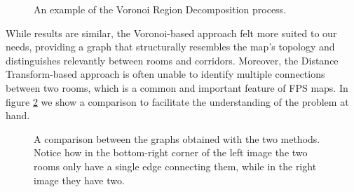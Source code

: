 \begin{figure}[hbt!]
    \qquad
    
    \caption[Voronoi Region Decomposition example]{An example of the Voronoi Region Decomposition process.}
    \label{fig:voronoi_region_decomposition}
\end{figure}

While results are similar, the Voronoi-based approach felt more suited to our needs, providing a graph that structurally resembles the map's topology and distinguishes relevantly between rooms and corridors. Moreover, the Distance Transform-based approach is often unable to identify multiple connections between two rooms, which is a common and important feature of FPS maps. In figure \cref{fig:graph_comparison} we show a comparison to facilitate the understanding of the problem at hand.

\begin{figure}[hbt!]
    \centering
    \qquad
    \caption[Graph comparison]{A comparison between the graphs obtained with the two methods. Notice how in the bottom-right corner of the left image the two rooms only have a single edge connecting them, while in the right image they have two.}
    \label{fig:graph_comparison}
\end{figure}

